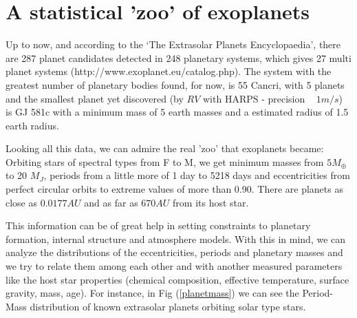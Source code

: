 \documentclass[dvips,12pt,a4paper]{report}
\begin{document}

\section {A statistical 'zoo' of exoplanets}

\indent Up to now, and according to the `The Extrasolar Planets Encyclopaedia', there are 287 planet candidates detected in 248 planetary systems, which gives 27 multi planet systems (http://www.exoplanet.eu/catalog.php). The system with the greatest number of planetary bodies found, for now, is 55 Cancri, with 5 planets \citep{Fischer-2008} and the smallest planet yet discovered (by $RV$ with HARPS - precision ~ $1m/s$) is GJ 581c \citep{Udry-2007b} with a minimum mass of 5 earth masses and a estimated radius of 1.5 earth radius. 

Looking all this data, we can admire the real 'zoo' that exoplanets became: Orbiting stars of spectral types from F to M, we get minimum masses from $5 M_{\oplus}$ to 20 $M_J$, periods from a little more of 1 day to 5218 days and eccentricities from perfect circular orbits to extreme values of more than 0.90. There are planets as close as $0.0177 AU$ and as far as $670 AU$ from its host star.

This information can be of great help in setting constraints to planetary formation, internal structure and atmosphere models. With this in mind, we can analyze the distributions of the eccentricities, periods and planetary masses and we try to relate them among each other and with another measured parameters like the host star properties (chemical composition, effective temperature, surface gravity, mass, age). For instance, in Fig (\ref{planetmass}) we can see the Period-Mass distribution of known extrasolar planets orbiting solar type stars.
\end{document}
